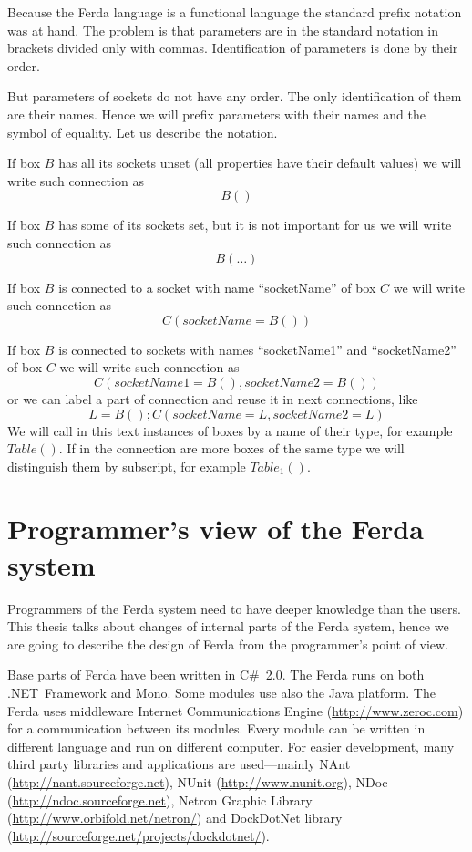 \documentclass[a4paper,12pt]{book}
\begin{document}
Because the Ferda language is a functional language the standard prefix notation was at hand. The problem is that parameters are in the standard notation in brackets divided only with commas. Identification of parameters is done by their order.

But parameters of sockets do not have any order. The only identification of them are their names. Hence we will prefix parameters with their names and the symbol of equality. Let us describe the notation.

If box $B$ has all its sockets unset (all properties have their default values) we will write such connection as
\begin{equation}
B()
\end{equation}

If box $B$ has some of its sockets set, but it is not important for us we will write such connection as
\begin{equation}
B(\dots)
\end{equation}

If box $B$ is connected to a socket with name ``socketName'' of box $C$ we will write such connection as
\begin{equation}
C(socketName=B())
\end{equation}

If box $B$ is connected to sockets with names ``socketName1'' and ``socketName2'' of box $C$ we will write such connection as
\begin{equation}
C(socketName1=B(), socketName2=B())
\end{equation}
or we can label a part of connection and reuse it in next connections, like
\begin{equation}
L=B(); C(socketName=L, socketName2=L)
\end{equation}
We will call in this text instances of boxes by a name of their type, for example $Table()$. If in the connection are more boxes of the same type we will distinguish them by subscript, for example $Table_1()$.

\section{Programmer's view of the Ferda system}
Programmers of the Ferda system need to have deeper knowledge than the users. This thesis talks about changes of internal parts of the Ferda system, hence we are going to describe the design of Ferda from the programmer's point of view.

Base parts of Ferda have been written in C\#~2.0. The Ferda runs on both .NET~Framework and Mono. Some modules use also the Java platform. The Ferda uses middleware Internet Communications Engine (\url{http://www.zeroc.com}) for a communication between its modules. Every module can be written in different language and run on different computer. For easier development, many third party libraries and applications are used---mainly NAnt (\url{http://nant.sourceforge.net}), NUnit (\url{http://www.nunit.org}), NDoc (\url{http://ndoc.sourceforge.net}), Netron Graphic Library (\url{http://www.orbifold.net/netron/}) and DockDotNet library (\url{http://sourceforge.net/projects/dockdotnet/}).
\end{document}
